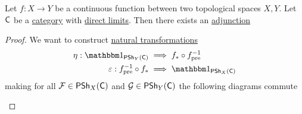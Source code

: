 \documentclass[../../../main]{subfiles}
\begin{document}
\begin{theorem} \label{thm:direct-inverse-image-adjunction-presheaf}
  Let \(f: X \to Y\) be a continuous function between two topological spaces \(X, Y\).
  Let \(\mathsf{C}\) be a \hyperref[def:category]{category} with \hyperref[def:direct-limit]{direct limits}.
  Then there exists an \hyperref[def:adjoint-functors]{adjunction}
  \begin{center}
  \end{center}
\end{theorem}
\begin{proof}
  We want to construct \hyperref[def:natural-transformation]{natural transformations}
  \begin{align*}
    \eta: \id_{\PSh_{Y}(\category{C})} &\implies f_{\ast} \circ f_{\operatorname{pre}}^{-1} \\
    \varepsilon: f_{\operatorname{pre}}^{-1} \circ f_{\ast} &\implies \id_{\PSh_{X}(\category{C})}
  \end{align*}
  making for all \(\mathcal{F} \in \mathsf{PSh}_{X}(\mathsf{C})\) and \(\mathcal{G} \in \mathsf{PSh}_{Y}(\mathsf{C})\) the following diagrams commute
  \begin{center}
  \end{center}


\end{proof}
\end{document}
